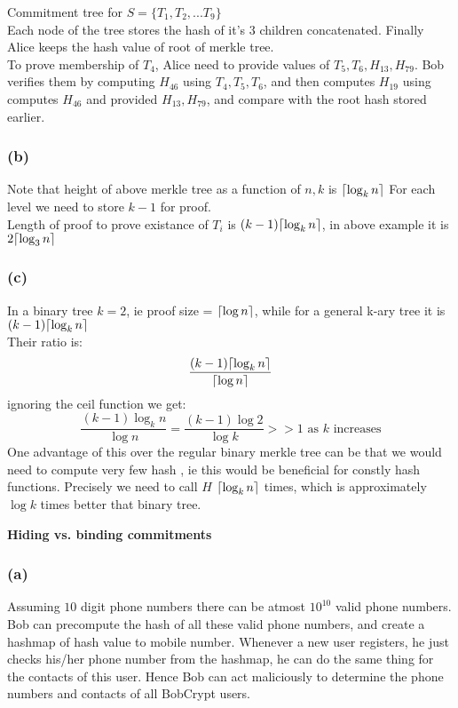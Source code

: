 \documentclass[a4paper]{article}
\DeclarePairedDelimiter{\ceil}{\lceil}{\rceil}
\begin{document}
Commitment tree for $S=\{ T_1, T_2, ...T_9\}$ \\
Each node of the tree stores the hash of it's $3$ children concatenated. Finally Alice keeps the hash value of
root of merkle tree. \\
To prove membership of $T_4$, Alice need to provide values of $T_5,T_6, H_{13}, H_{79}$. Bob verifies them
by computing $H_{46}$ using $T_4, T_5, T_6$, and then computes $H_{19}$ using computes $H_{46}$ and provided
$H_{13}, H_{79}$, and compare with the root hash stored earlier.

\subsubsection*{(b)}
Note that height of above merkle tree as a function of $n, k$ is $\ceil{\log_k n}$
For each level we need to store $k-1$ for proof.\\
Length of proof to prove existance of $T_i$ is $(k-1)\ceil{\log_k n}$, in above example it is $2\ceil{\log_3 n}$

\subsubsection*{(c)}
In a binary tree $k = 2$, ie proof size = $\ceil{\log n}$, while for a general k-ary tree it is $(k-1)\ceil{\log_k n}$ \\

Their ratio is:
$$\dfrac{(k-1)\ceil{\log_k n}}{\ceil{\log n}}$$
ignoring the ceil function we get:
$$\dfrac{(k-1)\log_k n}{\log n} =  \dfrac{(k-1)\log 2}{\log k} >> 1 \text{ as $k$ increases}$$
One advantage of this over the regular binary merkle tree can be that we would need to compute very few hash
, ie this would be beneficial for constly hash functions.
Precisely we need to call $H$ $\ceil{\log_k n}$ times, which is approximately $\log k$ times better
that binary tree.

\begin{question}
    \textbf{Hiding vs. binding commitments}
\end{question}

\subsubsection*{(a)}
Assuming $10$ digit phone numbers there can be atmost $10^{10}$ valid phone numbers. Bob can precompute the 
hash of all these valid phone numbers, and create a hashmap of hash value to mobile number.
Whenever a new user registers, he just checks his/her phone number from the hashmap, he can do the
same thing for the contacts of this user. Hence Bob can act maliciously to determine the phone
numbers and contacts of all BobCrypt users.
\end{document}
